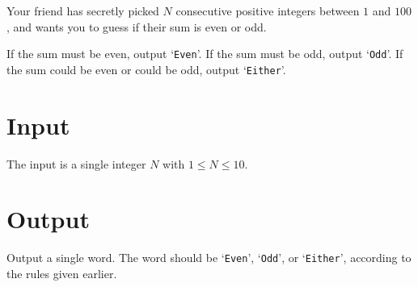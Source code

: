 
\ifdefined\pacnw
{}
\else
{}
\fi

\noindent
Your friend has secretly picked $N$ consecutive positive
integers between $1$ and $100$, and wants you to guess if their sum is
even or odd.

If the sum must be even, output `{\tt Even}'.  If the sum must be
odd, output `{\tt Odd}'.  If the sum could be even or could be odd,
output `{\tt Either}'.

\section*{Input}

The input is a single integer $N$ with $1 \le N \le 10$.

\section*{Output}

Output a single word. The word should be `{\tt Even}', `{\tt Odd}', or 
`{\tt Either}', according to the rules given earlier.


